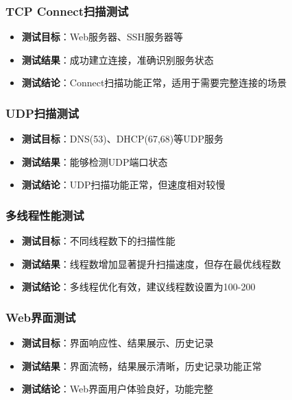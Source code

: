 \documentclass[12pt,hyperref,a4paper,UTF8]{ctexart}
\begin{document}
\subsubsection{TCP Connect扫描测试}
\begin{itemize}
    \item \textbf{测试目标}：Web服务器、SSH服务器等
    \item \textbf{测试结果}：成功建立连接，准确识别服务状态
    \item \textbf{测试结论}：Connect扫描功能正常，适用于需要完整连接的场景
\end{itemize}

\subsubsection{UDP扫描测试}
\begin{itemize}
    \item \textbf{测试目标}：DNS(53)、DHCP(67,68)等UDP服务
    \item \textbf{测试结果}：能够检测UDP端口状态
    \item \textbf{测试结论}：UDP扫描功能正常，但速度相对较慢
\end{itemize}

\subsubsection{多线程性能测试}
\begin{itemize}
    \item \textbf{测试目标}：不同线程数下的扫描性能
    \item \textbf{测试结果}：线程数增加显著提升扫描速度，但存在最优线程数
    \item \textbf{测试结论}：多线程优化有效，建议线程数设置为100-200
\end{itemize}

\subsubsection{Web界面测试}
\begin{itemize}
    \item \textbf{测试目标}：界面响应性、结果展示、历史记录
    \item \textbf{测试结果}：界面流畅，结果展示清晰，历史记录功能正常
    \item \textbf{测试结论}：Web界面用户体验良好，功能完整
\end{itemize}
\end{document}
